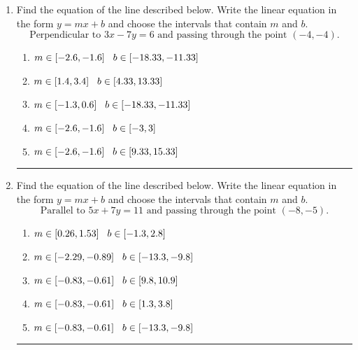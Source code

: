 \documentclass[14pt]{extbook}
\newcommand{\litem}[1]{\item#1\hspace*{-1cm}\rule{\textwidth}{0.4pt}}
\begin{document}
\begin{enumerate}
{\begin{enumerate}[label=\Alph*.]
\end{enumerate} }
\litem{
Find the equation of the line described below. Write the linear equation in the form $ y=mx+b $ and choose the intervals that contain $m$ and $b$.\[ \text{Perpendicular to } 3 x - 7 y = 6 \text{ and passing through the point } (-4, -4). \]\begin{enumerate}[label=\Alph*.]
\item \( m \in [-2.6, -1.6] \hspace*{3mm} b \in [-18.33, -11.33] \)
\item \( m \in [1.4, 3.4] \hspace*{3mm} b \in [4.33, 13.33] \)
\item \( m \in [-1.3, 0.6] \hspace*{3mm} b \in [-18.33, -11.33] \)
\item \( m \in [-2.6, -1.6] \hspace*{3mm} b \in [-3, 3] \)
\item \( m \in [-2.6, -1.6] \hspace*{3mm} b \in [9.33, 15.33] \)

\end{enumerate} }
\litem{
Find the equation of the line described below. Write the linear equation in the form $ y=mx+b $ and choose the intervals that contain $m$ and $b$.\[ \text{Parallel to } 5 x + 7 y = 11 \text{ and passing through the point } (-8, -5). \]\begin{enumerate}[label=\Alph*.]
\item \( m \in [0.26, 1.53] \hspace*{3mm} b \in [-1.3, 2.8] \)
\item \( m \in [-2.29, -0.89] \hspace*{3mm} b \in [-13.3, -9.8] \)
\item \( m \in [-0.83, -0.61] \hspace*{3mm} b \in [9.8, 10.9] \)
\item \( m \in [-0.83, -0.61] \hspace*{3mm} b \in [1.3, 3.8] \)
\item \( m \in [-0.83, -0.61] \hspace*{3mm} b \in [-13.3, -9.8] \)


\end{enumerate}}
\end{enumerate}
\end{document}
